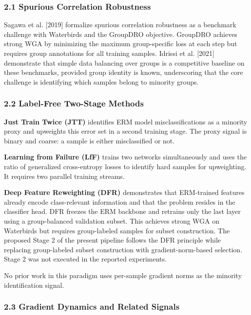 
\subsubsection{2.1 Spurious Correlation Robustness}

Sagawa et al. [2019] formalize spurious correlation robustness as a benchmark challenge with Waterbirds and the GroupDRO objective. GroupDRO achieves strong WGA by minimizing the maximum group-specific loss at each step but requires group annotations for all training samples. Idrissi et al. [2021] demonstrate that simple data balancing over groups is a competitive baseline on these benchmarks, provided group identity is known, underscoring that the core challenge is identifying which samples belong to minority groups.

\subsubsection{2.2 Label-Free Two-Stage Methods}

\textbf{Just Train Twice (JTT)} \citep{Liu2021Just} identifies ERM model misclassifications as a minority proxy and upweights this error set in a second training stage. The proxy signal is binary and coarse: a sample is either misclassified or not.

\textbf{Learning from Failure (LfF)} \citep{Nam2020Learning} trains two networks simultaneously and uses the ratio of generalized cross-entropy losses to identify hard samples for upweighting. It requires two parallel training streams.

\textbf{Deep Feature Reweighting (DFR)} \citep{Kirichenko2022Last} demonstrates that ERM-trained features already encode class-relevant information and that the problem resides in the classifier head. DFR freezes the ERM backbone and retrains only the last layer using a group-balanced validation subset. This achieves strong WGA on Waterbirds but requires group-labeled samples for subset construction. The proposed Stage 2 of the present pipeline follows the DFR principle while replacing group-labeled subset construction with gradient-norm-based selection. Stage 2 was not executed in the reported experiments.

No prior work in this paradigm uses per-sample gradient norms as the minority identification signal.

\subsubsection{2.3 Gradient Dynamics and Related Signals}


